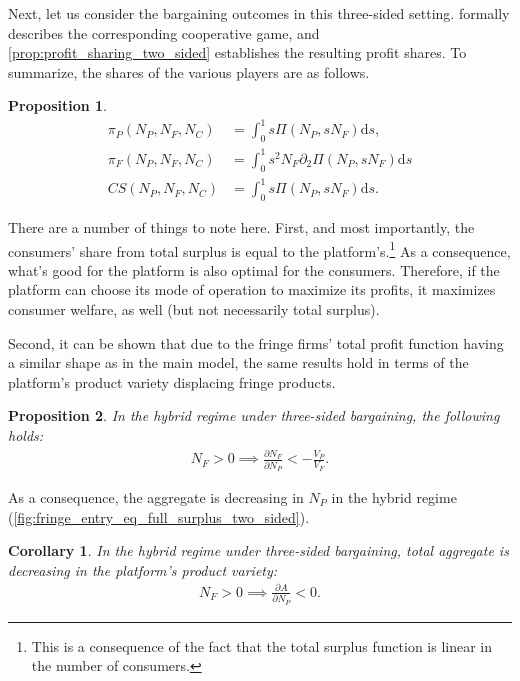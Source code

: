 \documentclass[a4paper]{article}
\newtheorem{proposition}{Proposition}
\newtheorem{corollary}{Corollary}
\newcommand{\ds}{\mathrm{d}s}
\begin{document}
Next, let us consider the bargaining outcomes in this three-sided setting.
 formally describes the corresponding cooperative game, and \cref{prop:profit_sharing_two_sided} establishes the resulting profit shares.
To summarize, the shares of the various players are as follows.
\begin{proposition}
    \label{prop:three_way_shapley_value}
    \begin{align*}
        \pi_P(N_P, N_F, N_C) &= \int_0^1 s \Pi(N_P, s N_F) \ds, \\
        \pi_F(N_P, N_F, N_C) &= \int_0^1 s^2 N_F \partial_2 \Pi(N_P, s N_F) \ds \\
        CS(N_P, N_F, N_C) &= \int_0^1 s \Pi(N_P, s N_F) \ds.
    \end{align*}
\end{proposition}

There are a number of things to note here.
First, and most importantly, the consumers' share from total surplus is equal to the platform's.\footnote{
    This is a consequence of the fact that the total surplus function is linear in the number of consumers.
}
As a consequence, what's good for the platform is also optimal for the consumers.
Therefore, if the platform can choose its mode of operation to maximize its profits, it maximizes consumer welfare, as well (but not necessarily total surplus).

Second, it can be shown that due to the fringe firms' total profit function having a similar shape as in the main model, the same results hold in terms of the platform's product variety displacing fringe products.
\begin{proposition}
    In the hybrid regime under three-sided bargaining, the following holds:
    \begin{align*}
        N_F > 0 \implies \frac{\partial N_F}{\partial N_P} < -\frac{V_P}{V_F}.
    \end{align*}
\end{proposition}
As a consequence, the aggregate is decreasing in $N_P$ in the hybrid regime (\cref{fig:fringe_entry_eq_full_surplus_two_sided}).
\begin{corollary}
    In the hybrid regime under three-sided bargaining, total aggregate is decreasing in the platform's product variety:
    \begin{align*}
        N_F > 0 \implies \frac{\partial A}{\partial N_P} < 0.
    \end{align*}
\end{corollary}
\end{document}
